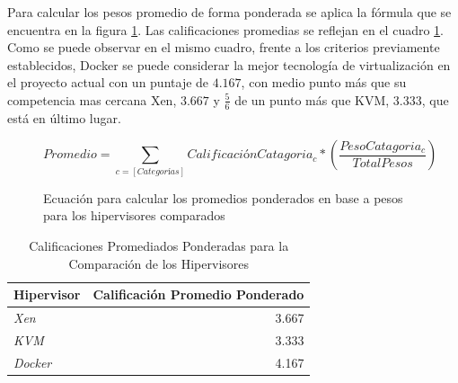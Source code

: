 Para calcular los pesos promedio de forma ponderada se aplica la fórmula que se encuentra en la figura \ref{fig:hipervisor-calif-equ}. Las calificaciones promedias se reflejan en el cuadro \ref{tab:hipervisor-compar-promed}. Como se puede observar en el mismo cuadro, frente a los criterios previamente establecidos, Docker se puede considerar la mejor tecnología de virtualización en el proyecto actual con un puntaje de $4.167$, con medio punto más que su competencia mas cercana Xen, $3.667$ y $\frac{5}{6}$ de un punto más que KVM, $3.333$, que está en último lugar.

\begin{figure}
	\[
		Promedio = \sum_{c = [Categorías]} CalificaciónCatagoria_c * \left ( \frac{PesoCatagoria_c}{TotalPesos} \right )
	\]
	\caption{Ecuación para calcular los promedios ponderados en base a pesos para los hipervisores comparados}
    \label{fig:hipervisor-calif-equ}
\end{figure}

\begin{table}
	\centering
	\begin{tabular}{|l|r|}
    	\hline
		\textbf{Hipervisor} & \textbf{Calificación Promedio Ponderado} \\
        \hline
        \textit{Xen} & 3.667 \\
        \hline
        \textit{KVM} & 3.333 \\
        \hline
        \textit{Docker} & 4.167 \\
        \hline
	\end{tabular}
    \caption{Calificaciones Promediados Ponderadas para la Comparación de los Hipervisores}
    \label{tab:hipervisor-compar-promed}
\end{table}

  
